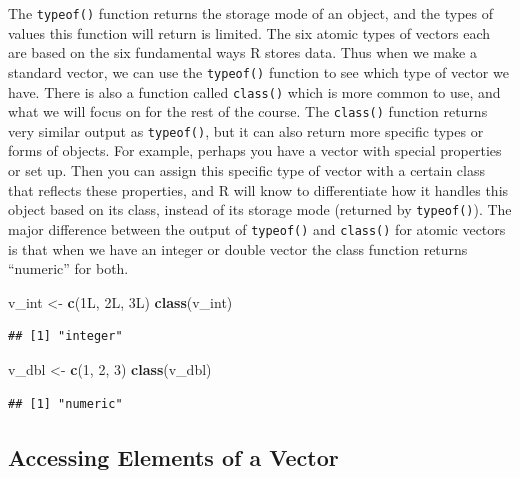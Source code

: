 \documentclass[
]{book}
\newenvironment{Shaded}{\begin{snugshade}}{\end{snugshade}}
\newcommand{\DecValTok}[1]{\textcolor[rgb]{0.00,0.00,0.81}{#1}}
\newcommand{\KeywordTok}[1]{\textcolor[rgb]{0.13,0.29,0.53}{\textbf{#1}}}
\newcommand{\NormalTok}[1]{#1}
\newcommand{\StringTok}[1]{\textcolor[rgb]{0.31,0.60,0.02}{#1}}
\begin{document}
The \texttt{typeof()} function returns the storage mode of an object, and the types of values this function will return is limited. The six atomic types of vectors each are based on the six fundamental ways R stores data. Thus when we make a standard vector, we can use the \texttt{typeof()} function to see which type of vector we have. There is also a function called \texttt{class()} which is more common to use, and what we will focus on for the rest of the course. The \texttt{class()} function returns very similar output as \texttt{typeof()}, but it can also return more specific types or forms of objects. For example, perhaps you have a vector with special properties or set up. Then you can assign this specific type of vector with a certain class that reflects these properties, and R will know to differentiate how it handles this object based on its class, instead of its storage mode (returned by \texttt{typeof()}). The major difference between the output of \texttt{typeof()} and \texttt{class()} for atomic vectors is that when we have an integer or double vector the class function returns ``numeric'' for both.

\begin{Shaded}
\begin{Highlighting}[]
\NormalTok{v_int <-}\StringTok{ }\KeywordTok{c}\NormalTok{(1L, 2L, 3L)}
\KeywordTok{class}\NormalTok{(v_int)}
\end{Highlighting}
\end{Shaded}

\begin{verbatim}
## [1] "integer"
\end{verbatim}

\begin{Shaded}
\begin{Highlighting}[]
\NormalTok{v_dbl <-}\StringTok{ }\KeywordTok{c}\NormalTok{(}\DecValTok{1}\NormalTok{, }\DecValTok{2}\NormalTok{, }\DecValTok{3}\NormalTok{)}
\KeywordTok{class}\NormalTok{(v_dbl)}
\end{Highlighting}
\end{Shaded}

\begin{verbatim}
## [1] "numeric"
\end{verbatim}

\hypertarget{index}{%
\subsection{Accessing Elements of a Vector}\label{index}}
\end{document}
